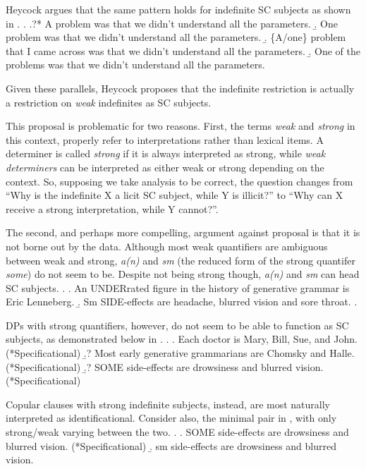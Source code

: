 \documentclass[GPFinal]{subfiles}
\begin{document}
Heycock argues that the same pattern holds for indefinite SC subjects as shown in \Next.
\ex.
\a.?* A problem was that we didn't understand all the parameters.
\b. One problem was that we didn't understand all the parameters.
\b. \{A/one\} problem that I came across was that we didn't understand all the parameters.
\b. One of the problems was that we didn't understand all the parameters.\hfill\parencite{heycock2012specification}

Given these parallels, Heycock proposes that the indefinite restriction is actually a restriction on \textit{weak} indefinites as SC subjects.

This proposal is problematic for two reasons.
First, the terms \textit{weak} and \textit{strong} in this context, properly refer to interpretations rather than lexical items.
A determiner is called \textit{strong} if it is always interpreted as strong, while \textit{weak determiners} can be interpreted as either weak or strong depending on the context.
So, supposing we take  analysis to be correct, the question changes from ``Why is the indefinite X a licit SC subject, while Y is illicit?'' to ``Why can X receive a strong interpretation, while Y cannot?''.

The second, and perhaps more compelling, argument against  proposal is that it is not borne out by the data.
Although most weak quantifiers are ambiguous between weak and strong, \textit{a(n)} and \textit{sm} (the reduced form of the strong quantifer \textit{some}) do not seem to be.
Despite not being strong though, \textit{a(n)} and \textit{sm} can head SC subjects.
\ex.
\a. An UNDERrated figure in the history of generative grammar is Eric Lenneberg.
\b. Sm SIDE-effects are headache, blurred vision and sore throat.
\z.

DPs with strong quantifiers, however, do not seem to be able to function as SC subjects, as demonstrated below in \Next.
\ex.
\a. Each doctor is Mary, Bill, Sue, and John. (*Specificational)
\b.? Most early generative grammarians are Chomsky and Halle. (*Specificational)
\b.? SOME side-effects are drowsiness and blurred vision. (*Specificational)

Copular clauses with strong indefinite subjects, instead, are most naturally interpreted as identificational.
Consider also, the minimal pair in \Next, with only strong/weak varying between the two.
\ex.
\a. SOME side-effects are drowsiness and blurred vision. (*Specificational)
\b. sm side-effects are drowsiness and blurred vision.
\end{document}
